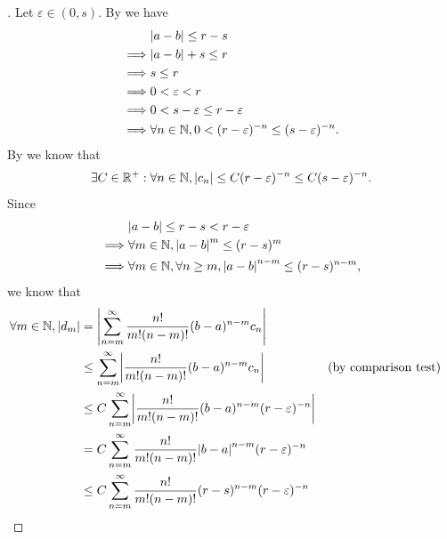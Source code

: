 \begin{proof}[]
  Let \(\varepsilon \in (0, s)\).
  By  we have
  \begin{align*}
             & \abs{a - b} \leq r - s                                                    \\
    \implies & \abs{a - b} + s \leq r                                                    \\
    \implies & s \leq r                                                                  \\
    \implies & 0 < \varepsilon < r                                                       \\
    \implies & 0 < s - \varepsilon \leq r - \varepsilon                                  \\
    \implies & \forall n \in \N, 0 < (r - \varepsilon)^{-n} \leq (s - \varepsilon)^{-n}.
  \end{align*}
  By  we know that
  \[
    \exists C \in \mathbb{R}^+ : \forall n \in \mathbb{N}, \left\lvert c_n\right\rvert \leq C (r - \varepsilon)^{-n} \leq C (s - \varepsilon)^{-n}.
  \]
  Since
  \begin{align*}
             & \abs{a - b} \leq r - s < r - \varepsilon                                      \\
    \implies & \forall m \in \N, \abs{a - b}^{m} \leq (r - s)^m                              \\
    \implies & \forall m \in \N, \forall n \geq m, \abs{a - b}^{n - m} \leq (r - s)^{n - m},
  \end{align*}
  we know that
  \begin{align*}
    \forall m \in \N, \abs{d_m} & = \abs{\sum_{n = m}^\infty \dfrac{n!}{m! (n - m)!} (b - a)^{n - m} c_n}                                                          \\
                                & \leq \sum_{n = m}^\infty \abs{\dfrac{n!}{m! (n - m)!} (b - a)^{n - m} c_n}                      &  & \text{(by comparison test)} \\
                                & \leq C \sum_{n = m}^\infty \abs{\dfrac{n!}{m! (n - m)!} (b - a)^{n - m} (r - \varepsilon)^{-n}}                                  \\
                                & = C \sum_{n = m}^\infty \dfrac{n!}{m! (n - m)!} \abs{b - a}^{n - m} (r - \varepsilon)^{-n}                                       \\
                                & \leq C \sum_{n = m}^\infty \dfrac{n!}{m! (n - m)!} (r - s)^{n - m} (r - \varepsilon)^{-n}                                        \\

\end{align*}
\end{proof}
